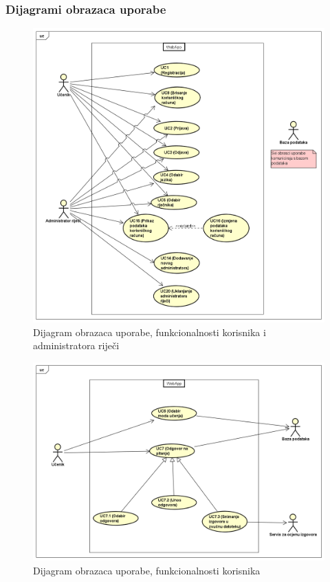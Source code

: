 				
					
				\subsubsection{Dijagrami obrazaca uporabe}
					

					\begin{figure}[H]
						\includegraphics[width=\textwidth]{slike/UseCaseDiagram0.PNG}
						\caption{Dijagram obrazaca uporabe, funkcionalnosti korisnika i administratora riječi}
						\label{fig:useCaseDiagram0}
					\end{figure}
					
					\begin{figure}[H]
						\includegraphics[width=\textwidth]{slike/UseCaseDiagram1.PNG}
						\caption{Dijagram obrazaca uporabe, funkcionalnosti korisnika}
						\label{fig:useCaseDiagram1}
					\end{figure}
					
